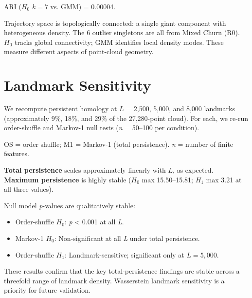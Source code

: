 ARI ($H_0$ $k = 7$ vs. GMM) = 0.00004.

Trajectory space is topologically connected: a single giant component with heterogeneous density. The 6 outlier singletons are all from Mixed Churn (R0). $H_0$ tracks global connectivity; GMM identifies local density modes. These measure different aspects of point-cloud geometry.


\section{Landmark Sensitivity}
\label{app:landmarks}

We recompute persistent homology at $L$ = 2,500, 5,000, and 8,000 landmarks (approximately 9\%, 18\%, and 29\% of the 27,280-point cloud). For each, we re-run order-shuffle and Markov-1 null tests (\textit{n} = 50--100 per condition).

\begin{table}[htbp]
\centering
\caption{Landmark Sensitivity Analysis.}
\label{tab:landmark-sensitivity}
\footnotesize
{}
\end{table}

OS = order shuffle; M1 = Markov-1 (total persistence). \textit{n} = number of finite features.

\textbf{Total persistence} scales approximately linearly with $L$, as expected. \textbf{Maximum persistence} is highly stable ($H_0$ max 15.50--15.81; $H_1$ max 3.21 at all three values).

Null model \textit{p}-values are qualitatively stable:
\begin{itemize}
  \item Order-shuffle $H_0$: \textit{p} < 0.001 at all \textit{L}.
  \item Markov-1 $H_0$: Non-significant at all \textit{L} under total persistence.
  \item Order-shuffle $H_1$: Landmark-sensitive; significant only at $L = 5{,}000$.
\end{itemize}

These results confirm that the key total-persistence findings are stable across a threefold range of landmark density. Wasserstein landmark sensitivity is a priority for future validation.



